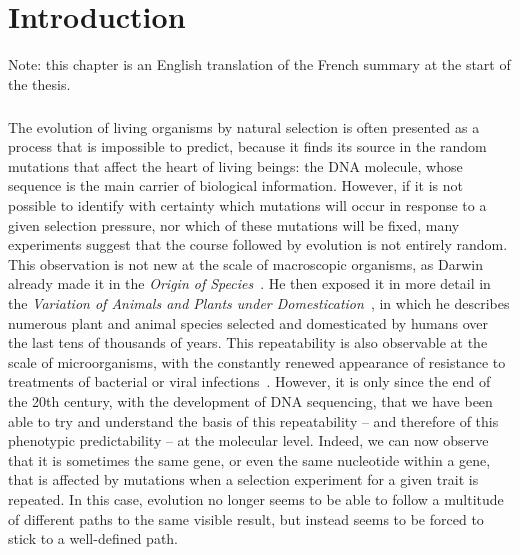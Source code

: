 \chapter{Introduction}
\label{chap:intro}

Note: this chapter is an English translation of the French summary at the start of the thesis.

\paragraph{}
The evolution of living organisms by natural selection is often presented as a process that is impossible to predict, because it finds its source in the random mutations that affect the heart of living beings: the DNA molecule, whose sequence is the main carrier of biological information.
However, if it is not possible to identify with certainty which mutations will occur in response to a given selection pressure, nor which of these mutations will be fixed, many experiments suggest that the course followed by evolution is not entirely random.
This observation is not new at the scale of macroscopic organisms, as Darwin already made it in the \emph{Origin of Species}~\citep{darwin1859}.
He then exposed it in more detail in the \emph{Variation of Animals and Plants under Domestication}~\citep{darwin1868}, in which he describes numerous plant and animal species selected and domesticated by humans over the last tens of thousands of years.
This repeatability is also observable at the scale of microorganisms, with the constantly renewed appearance of resistance to treatments of bacterial or viral infections~\citep{levy2004}.
However, it is only since the end of the 20th century, with the development of DNA sequencing, that we have been able to try and understand the basis of this repeatability -- and therefore of this phenotypic predictability -- at the molecular level.
Indeed, we can now observe that it is sometimes the same gene, or even the same nucleotide within a gene, that is affected by mutations when a selection experiment for a given trait is repeated.
In this case, evolution no longer seems to be able to follow a multitude of different paths to the same visible result, but instead seems to be forced to stick to a well-defined path.

